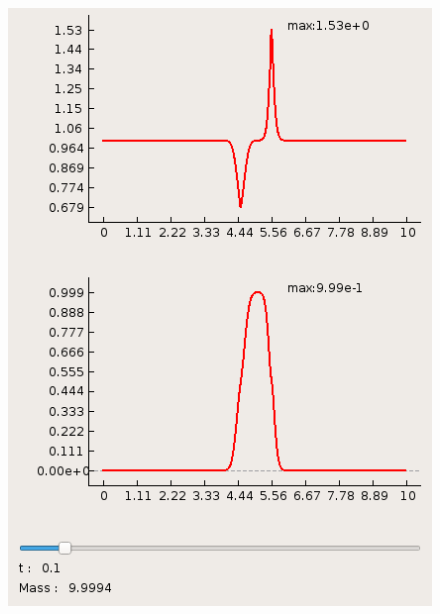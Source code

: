 \documentclass[a4paper, 11pt]{article}
\begin{document}
\begin{figure}[H]
\begin{minipage}[h] {0.49\linewidth}
		\includegraphics[width=1\linewidth]{p2/p2_t=0,1.png}
	\end{minipage}
\end{figure}
\end{document}
